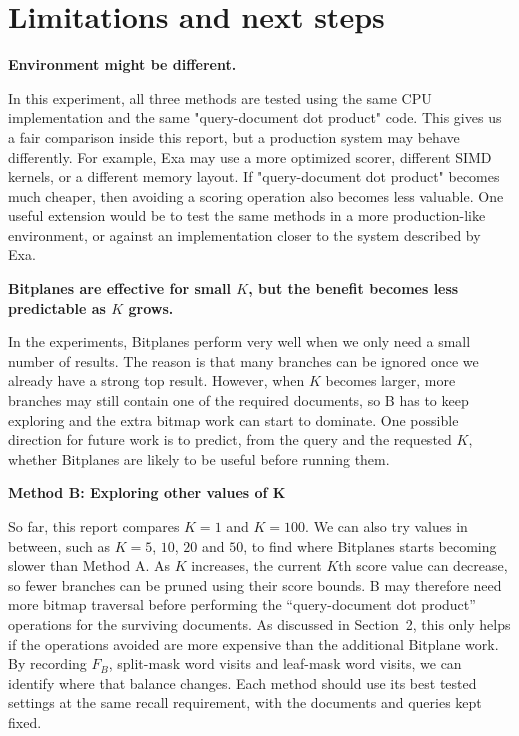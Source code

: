 \section{Limitations and next steps}
\textbf{Environment might be different.}\par
In this experiment, all three methods are tested using the same CPU implementation and the same "query-document dot product" code. This gives us a fair comparison inside this report, but a production system may behave differently. For example, Exa may use a more optimized scorer, different SIMD kernels, or a different memory layout. If "query-document dot product" becomes much cheaper, then avoiding a scoring operation also becomes less valuable. One useful extension would be to test the same methods in a more production-like environment, or against an implementation closer to the system described by Exa.

\textbf{Bitplanes are effective for small $K$, but the benefit becomes less predictable as $K$ grows.}\par
In the experiments, Bitplanes perform very well when we only need a small number of results. The reason is that many branches can be ignored once we already have a strong top result. However, when $K$ becomes larger, more branches may still contain one of the required documents, so B has to keep exploring and the extra bitmap work can start to dominate. One possible direction for future work is to predict, from the query and the requested $K$, whether Bitplanes are likely to be useful before running them.

\textbf{Method B: Exploring other values of K}\par
So far, this report compares $K=1$ and $K=100$. We can also try values in between, such as $K=5$, $10$, $20$ and $50$, to find where Bitplanes starts becoming slower than Method A. As $K$ increases, the current $K$th score value can decrease, so fewer branches can be pruned using their score bounds. B may therefore need more bitmap traversal before performing the ``query-document dot product'' operations for the surviving documents. As discussed in Section~2, this only helps if the operations avoided are more expensive than the additional Bitplane work. By recording $F_B$, split-mask word visits and leaf-mask word visits, we can identify where that balance changes. Each method should use its best tested settings at the same recall requirement, with the documents and queries kept fixed.

